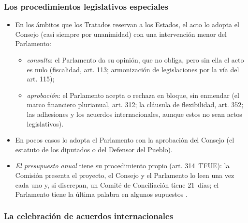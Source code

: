 \documentclass[11pt]{article}
\begin{document}
\subsubsection{Los procedimientos legislativos especiales}\label{sec:especiales}

\begin{itemize}
\item En los ámbitos que los Tratados reservan a los Estados, el acto lo adopta el Consejo (casi siempre por unanimidad) con una intervención menor del Parlamento:
  \begin{itemize}
  \item \emph{consulta}: el Parlamento da su opinión, que no obliga, pero sin ella el acto es nulo (fiscalidad, art. 113; armonización de legislaciones por la vía del art. 115);
  \item \emph{aprobación}: el Parlamento acepta o rechaza en bloque, sin enmendar (el marco financiero plurianual, art. 312; la cláusula de flexibilidad, art. 352; las adhesiones y los acuerdos internacionales, aunque estos no sean actos legislativos).
  \end{itemize}
\item En pocos casos lo adopta el Parlamento con la aprobación del Consejo (el estatuto de los diputados o del Defensor del Pueblo).
\item \emph{El presupuesto anual} tiene su procedimiento propio (art. 314~TFUE): la Comisión presenta el proyecto, el Consejo y el Parlamento lo leen una vez cada uno y, si discrepan, un Comité de Conciliación tiene 21~días; el Parlamento tiene la última palabra en algunos supuestos .
\end{itemize}

\subsubsection{La celebración de acuerdos internacionales}\label{sec:acuerdos}
\end{document}
